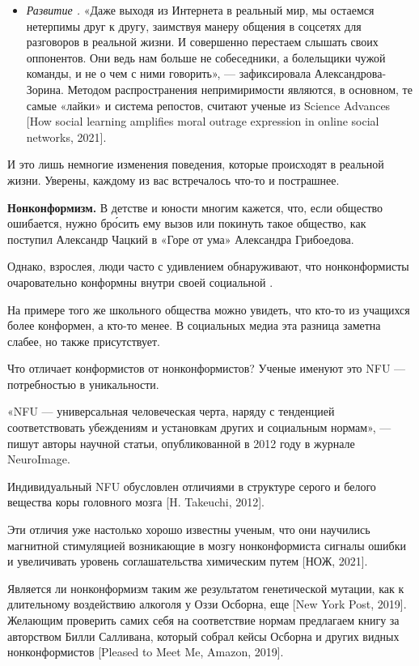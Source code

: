 \begin{itemize}[noitemsep, label=--]
    \item \textit{Развитие .} «Даже выходя из Интернета в реальный мир, мы остаемся нетерпимы друг к другу, заимствуя манеру общения в соцсетях для разговоров в реальной жизни. И совершенно перестаем слышать своих оппонентов. Они ведь нам больше не собеседники, а болельщики чужой команды, и не о чем с ними говорить», --- зафиксировала Александрова-Зорина. Методом распространения непримиримости являются, в основном, те самые «лайки» и система репостов, считают ученые из Science Advances [How social learning amplifies moral outrage expression in online social networks, 2021].
\end{itemize}
И это лишь немногие изменения поведения, которые происходят в реальной жизни. Уверены, каждому из вас встречалось что-то и пострашнее.

\textbf{Нонконформизм.}
В детстве и юности многим кажется, что, если общество ошибается, нужно бр\'{о}сить ему вызов или покинуть такое общество, как поступил Александр Чацкий в «Горе от ума» Александра Грибоедова.

Однако, взрослея, люди часто с удивлением обнаруживают, что нонконформисты очаровательно конформны внутри своей социальной .

На примере того же школьного общества можно увидеть, что кто-то из учащихся более конформен, а кто-то менее. В социальных медиа эта разница заметна слабее, но также присутствует.

Что отличает конформистов от нонконформистов? Ученые именуют это NFU --- потребностью в уникальности.

«NFU --- универсальная человеческая черта, наряду с тенденцией соответствовать убеждениям и установкам других и социальным нормам», --- пишут авторы научной статьи, опубликованной в 2012 году в журнале NeuroImage.

Индивидуальный NFU обусловлен отличиями в структуре серого и белого вещества коры головного мозга [H. Takeuchi, 2012].

Эти отличия уже настолько хорошо известны ученым, что они научились  магнитной стимуляцией возникающие в мозгу нонконформиста сигналы ошибки и увеличивать уровень соглашательства химическим путем [НОЖ, 2021].

Является ли нонконформизм таким же результатом генетической мутации, как  к длительному воздействию алкоголя у Оззи Осборна, еще  [New York Post, 2019]. Желающим проверить самих себя на соответствие нормам предлагаем книгу за авторством Билли Салливана, который собрал кейсы Осборна и других видных нонконформистов  [Pleased to Meet Me, Amazon, 2019].

